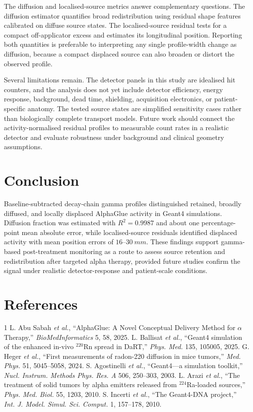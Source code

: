 \documentclass[10pt,twocolumn]{article}
\begin{document}
The diffusion and localised-source metrics answer complementary questions.
The diffusion estimator quantifies broad redistribution using residual shape
features calibrated on diffuse source states.  The localised-source residual
tests for a compact off-applicator excess and estimates its longitudinal
position.  Reporting both quantities is preferable to interpreting any single
profile-width change as diffusion, because a compact displaced source can
also broaden or distort the observed profile.

Several limitations remain.  The detector panels in this study are idealised
hit counters, and the analysis does not yet include detector efficiency,
energy response, background, dead time, shielding, acquisition electronics,
or patient-specific anatomy.  The tested source states are simplified
sensitivity cases rather than biologically complete transport models.  Future
work should connect the activity-normalised residual profiles to measurable
count rates in a realistic detector and evaluate robustness under background
and clinical geometry assumptions.

\section{Conclusion}

Baseline-subtracted decay-chain gamma profiles distinguished retained,
broadly diffused, and locally displaced AlphaGlue activity in Geant4
simulations.  Diffusion fraction was estimated with \(R^2=0.9987\) and about
one percentage-point mean absolute error, while localised-source residuals
identified displaced activity with mean position errors of
\(16\)--\(\SI{30}{mm}\).  These findings support gamma-based post-treatment
monitoring as a route to assess source retention and redistribution after
targeted alpha therapy, provided future studies confirm the signal under
realistic detector-response and patient-scale conditions.

\section*{References}
{\small
\scriptsize
\begin{thebibliography}{1}
L. Abu Sabah \textit{et al.}, ``AlphaGlue: A Novel Conceptual Delivery
Method for \(\alpha\) Therapy,'' \textit{BioMedInformatics} 5, 58, 2025.
L. Ballisat \textit{et al.}, ``Geant4 simulation of the enhanced in-vivo
\(^{220}\)Rn spread in DaRT,'' \textit{Phys. Med.} 135, 105005, 2025.
G. Heger \textit{et al.}, ``First measurements of radon-220 diffusion in
mice tumors,'' \textit{Med. Phys.} 51, 5045--5058, 2024.
S. Agostinelli \textit{et al.}, ``Geant4---a simulation toolkit,''
\textit{Nucl. Instrum. Methods Phys. Res. A} 506, 250--303, 2003.
L. Arazi \textit{et al.}, ``The treatment of solid tumors by alpha emitters
released from \(^{224}\)Ra-loaded sources,'' \textit{Phys. Med. Biol.} 55,
1203, 2010.
S. Incerti \textit{et al.}, ``The Geant4-DNA project,''
\textit{Int. J. Model. Simul. Sci. Comput.} 1, 157--178, 2010.
\end{thebibliography}
}
\end{document}
